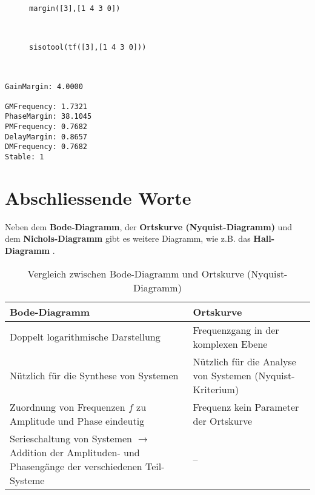 {\begin{figure}[!htb]
\begin{center}
  \vspace*{-3mm}\caption{{\tt margin([3],[1 4 3 0])}}
\end{center}
\vspace*{-8mm}
\end{figure}\\

\begin{figure}[!htb]
\vspace*{-5mm}%
\begin{center}
  \vspace*{-3mm}\caption{{\tt sisotool(tf([3],[1 4 3 0]))}}
\end{center}
\vspace*{-8mm}
\end{figure}\\
\newpage
\vspace*{-9mm}
\vspace*{-5mm}
\begin{verbatim}
GainMargin: 4.0000

GMFrequency: 1.7321
PhaseMargin: 38.1045
PMFrequency: 0.7682
DelayMargin: 0.8657
DMFrequency: 0.7682
Stable: 1
\end{verbatim}
\section{Abschliessende Worte}
Neben dem {\bf Bode-Diagramm}, der {\bf Ortskurve (Nyquist-Diagramm)} und dem {\bf Nichols-Diagramm} gibt es weitere Diagramm, wie z.B. das {\bf Hall-Diagramm} \cite{UNB:81}.

\begin{table}[htb]
\begin{center}\vspace*{-3mm}
{
\begin{tabular}{|p{7cm}|p{7cm}|}\hline
{\bf Bode-Diagramm} & {\bf Ortskurve}  \\ \hline\hline
 Doppelt logarithmische Darstellung & Frequenzgang in der komplexen Ebene \\ \hline
 N\"utzlich f\"ur die Synthese von Systemen & N\"utzlich f\"ur die Analyse von Systemen (Nyquist-Kriterium)  \\ \hline
Zuordnung von Frequenzen $f$ zu Amplitude und Phase eindeutig& Frequenz kein Parameter der Ortskurve\\ \hline
Serieschaltung von Systemen $\rightarrow$ Addition der Amplituden- und Phaseng\"ange der verschiedenen Teil-Systeme & --  \\ \hline
\end{tabular}\caption{Vergleich zwischen Bode-Diagramm und Ortskurve (Nyquist-Diagramm)}

}
\end{center}
\end{table}}
